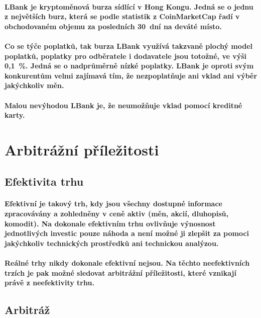 \documentclass[thesis=B,czech]{FITthesis}[2019/03/21]
\begin{document}
\paragraph{
LBank je kryptoměnová burza sídlící v Hong Kongu. Jedná se o jednu z největších burz, která se podle statistik z CoinMarketCap řadí v obchodovaném objemu za posledních 30~dní na deváté místo. \cite{coinmarketcap} \cite{cryptowisser_lbank}
}
\paragraph{
Co se týče poplatků, tak burza LBank využívá takzvaně plochý model poplatků, poplatky pro odběratele i dodavatele jsou totožné, ve výši 0,1~\%. Jedná se o nadprůměrně nízké poplatky. LBank je oproti svým konkurentům velmi zajímavá tím, že nezpoplatňuje ani vklad ani výběr jakýchkoliv měn. 
}
\paragraph{
Malou nevýhodou LBank je, že neumožňuje vklad pomocí kreditné karty. \cite{cryptowisser_lbank}
}

\section{Arbitrážní příležitosti}
\subsection{Efektivita trhu}
\paragraph{
Efektivní je takový trh, kdy jsou všechny dostupné informace zpracovávány a zohledněny v ceně aktiv (měn, akcií, dluhopisů, komodit). Na dokonale efektivním trhu ovlivňuje výnosnost jednotlivých investic pouze náhoda a není možné ji zlepšit za pomoci jakýchkoliv technických prostředků ani technickou analýzou. \cite{efektivita_trhu}
}
\paragraph{
Reálné trhy nikdy dokonale efektivní nejsou. Na těchto neefektivních trzích je pak možné sledovat arbitrážní příležitosti, které vznikají právě z neefektivity trhu. \cite{what_is_arbitage}
}
\subsection{Arbitráž}
\end{document}
